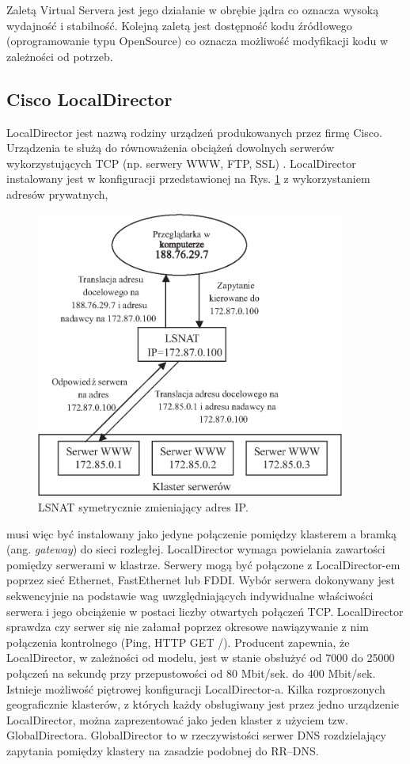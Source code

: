 Zaletą Virtual Servera jest jego działanie w obrębie jądra co oznacza wysoką wydajność i stabilność. Kolejną zaletą jest 
dostępność kodu źródłowego (oprogramowanie typu OpenSource) co oznacza możliwość modyfikacji kodu w zależności od potrzeb.

\subsection{Cisco LocalDirector}

LocalDirector jest nazwą rodziny urządzeń produkowanych przez firmę Cisco. Urządzenia te służą do 
równoważenia obciążeń dowolnych serwerów wykorzystujących TCP (np. serwery WWW, FTP, SSL) \cite{barylo30,barylo31}. 
LocalDirector instalowany jest w konfiguracji przedstawionej na Rys. \ref{LocalDirector} z wykorzystaniem adresów prywatnych, 
\begin{figure}[h]
\centering
\includegraphics[width=4in]{./rysunki/LocalDirector.eps}
\caption{LSNAT symetrycznie zmieniający adres IP.}
\label{LocalDirector}
\end{figure}

musi więc być instalowany jako jedyne połączenie pomiędzy klasterem a bramką (ang. \emph{gateway}) do sieci rozległej. 
LocalDirector wymaga powielania zawartości pomiędzy serwerami w klastrze. Serwery mogą być połączone z 
LocalDirector-em poprzez sieć Ethernet, FastEthernet lub FDDI. Wybór serwera dokonywany jest sekwencyjnie na 
podstawie wag uwzględniających indywidualne właściwości serwera i jego obciążenie w postaci liczby otwartych 
połączeń TCP. LocalDirector sprawdza czy serwer się nie załamał poprzez okresowe nawiązywanie z nim połączenia 
kontrolnego (Ping, HTTP GET /). Producent zapewnia, że LocalDirector, w zależności od modelu, jest w stanie 
obsłużyć od 7000 do 25000 połączeń na sekundę przy przepustowości od 80 Mbit/sek. do 400 Mbit/sek. Istnieje 
możliwość piętrowej konfiguracji LocalDirector-a. Kilka rozproszonych geograficznie klasterów, z których każdy 
obsługiwany jest przez jedno urządzenie LocalDirector, można zaprezentować jako jeden klaster z użyciem tzw. 
GlobalDirectora. GlobalDirector to w rzeczywistości serwer DNS rozdzielający zapytania pomiędzy klastery na 
zasadzie podobnej do RR--DNS. 

